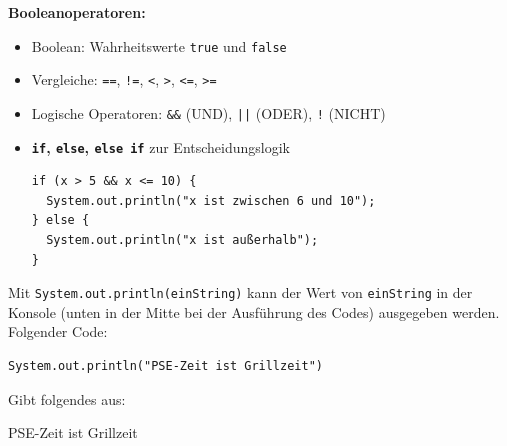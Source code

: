 \documentclass{../../sheet}
\begin{document}
\newpage
\textbf{Booleanoperatoren:}
\begin{itemize}
	\item Boolean: Wahrheitswerte \texttt{true} und \texttt{false}
	\item Vergleiche: \texttt{==}, \texttt{!=}, \texttt{<}, \texttt{>}, \texttt{<=}, \texttt{>=}
	\item Logische Operatoren: \texttt{\&\&} (UND), \texttt{||} (ODER), \texttt{!} (NICHT)
	\item \textbf{\texttt{if}, \texttt{else}, \texttt{else if}} zur Entscheidungslogik
	      \begin{verbatim}
if (x > 5 && x <= 10) {
  System.out.println("x ist zwischen 6 und 10");
} else {
  System.out.println("x ist außerhalb");
}
          \end{verbatim}
\end{itemize}
\newpage



Mit \texttt{System.out.println(einString)} kann der Wert von \texttt{einString} in der Konsole (unten in der Mitte bei der Ausführung des Codes) ausgegeben werden. Folgender Code:
\begin{verbatim}
System.out.println("PSE-Zeit ist Grillzeit")
\end{verbatim}
Gibt folgendes aus:
\begin{ausgabe}
	PSE-Zeit ist Grillzeit
\end{ausgabe}
\end{document}

